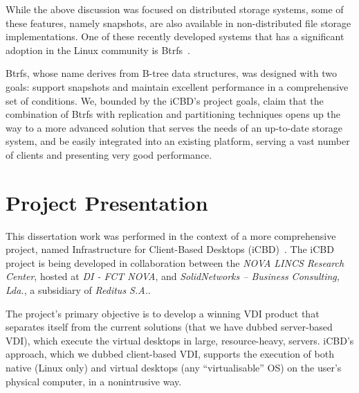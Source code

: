 While the above discussion was focused on distributed storage systems, some of these features, namely snapshots, are also available in non-distributed file storage implementations. One of these recently developed systems that has a significant adoption in the Linux community is Btrfs~\cite{Rodeh2013}.

Btrfs, whose name derives from B-tree data structures, was designed with two goals: support snapshots and maintain excellent performance in a comprehensive set of conditions. We, bounded by the iCBD’s project goals, claim that the combination of Btrfs with replication and partitioning techniques opens up the way to a more advanced solution that serves the needs of an up-to-date storage system, and be easily integrated into an existing platform, serving a vast number of clients and presenting very good performance.



\section{Project Presentation} %
\label{sec:intro_project_presentation}

This dissertation work was performed in the context of a more comprehensive project, named Infrastructure for Client-Based Desktops (iCBD)~\cite{Lopes2017}. The iCBD project is being developed in collaboration between the \textit{NOVA LINCS Research Center}, hosted at \textit{DI - FCT NOVA}, and \textit{SolidNetworks – Business Consulting, Lda.}, a subsidiary of \textit{Reditus S.A.}.

The project’s primary objective is to develop a winning VDI product that separates itself from the current solutions (that we have dubbed server-based VDI), which execute the virtual desktops in large, resource-heavy, servers. iCBD’s approach, which we dubbed client-based VDI, supports the execution of both native (Linux only) and virtual desktops (any “virtualisable” OS) on the user’s physical computer, in a nonintrusive way.


